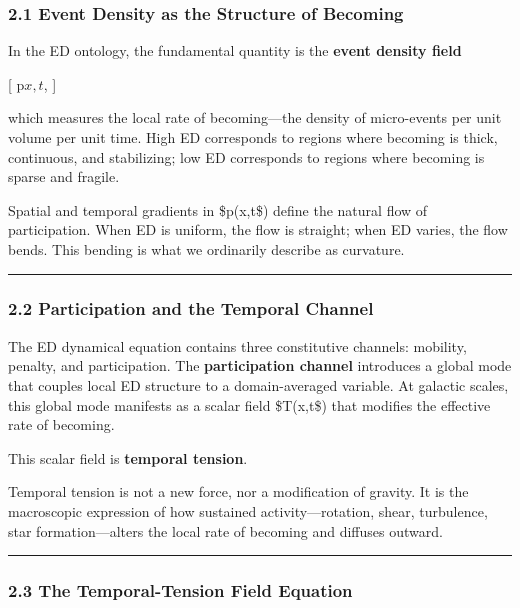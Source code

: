 \subsubsection{2.1 Event Density as the Structure of
Becoming}\label{event-density-as-the-structure-of-becoming}

In the ED ontology, the fundamental quantity is the \textbf{event
density field}

{[} p\(x,t\), {]}

which measures the local rate of becoming---the density of micro-events
per unit volume per unit time. High ED corresponds to regions where
becoming is thick, continuous, and stabilizing; low ED corresponds to
regions where becoming is sparse and fragile.

Spatial and temporal gradients in \$p(x,t\$) define the natural flow of
participation. When ED is uniform, the flow is straight; when ED varies,
the flow bends. This bending is what we ordinarily describe as
curvature.

\begin{center}\rule{0.5\linewidth}{0.5pt}\end{center}

\subsubsection{2.2 Participation and the Temporal
Channel}\label{participation-and-the-temporal-channel}

The ED dynamical equation contains three constitutive channels:
mobility, penalty, and participation. The \textbf{participation channel}
introduces a global mode that couples local ED structure to a
domain-averaged variable. At galactic scales, this global mode manifests
as a scalar field \$T(x,t\$) that modifies the effective rate of
becoming.

This scalar field is \textbf{temporal tension}.

Temporal tension is not a new force, nor a modification of gravity. It
is the macroscopic expression of how sustained activity---rotation,
shear, turbulence, star formation---alters the local rate of becoming
and diffuses outward.

\begin{center}\rule{0.5\linewidth}{0.5pt}\end{center}

\subsubsection{2.3 The Temporal-Tension Field
Equation}\label{the-temporal-tension-field-equation}

